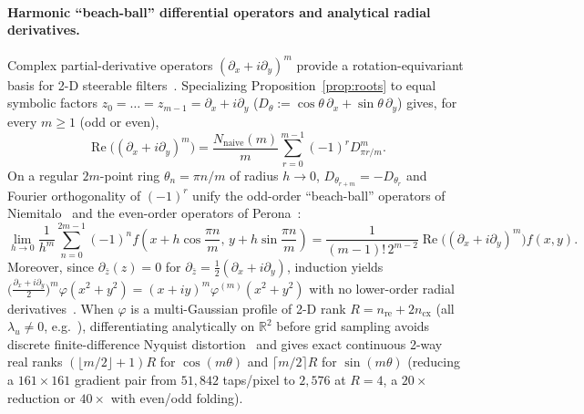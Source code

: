 \documentclass[11pt,a4paper]{article}
\theoremstyle{plain}
\theoremstyle{definition}
\newcommand{\R}{\mathbb{R}}
\newcommand{\Nnaive}{N_{\mathrm{naive}}}
\DeclareMathOperator{\RePart}{Re}
\begin{document}
\paragraph{Harmonic ``beach-ball'' differential operators and analytical radial derivatives.}
Complex partial-derivative operators $(\partial_x + i\partial_y)^m$ provide a rotation-equivariant basis for 2-D steerable filters~\cite{freeman1991steerable,koenderink1992generic,bigun2004linear,reisert2008complex}. Specializing Proposition~\ref{prop:roots} to equal symbolic factors $z_0 = \dots = z_{m-1} = \partial_x + i\partial_y$ ($D_\theta := \cos\theta\,\partial_x + \sin\theta\,\partial_y$) gives, for every $m \ge 1$ (odd or even),
\begin{equation}\label{eq:beachball}
  \RePart\!\bigl((\partial_x + i\partial_y)^m\bigr)
  = \frac{\Nnaive(m)}{m} \sum_{r=0}^{m-1} (-1)^r D_{\pi r / m}^m.
\end{equation}
On a regular $2m$-point ring $\theta_n = \pi n / m$ of radius $h \to 0$, $D_{\theta_{r+m}} = -D_{\theta_r}$ and Fourier orthogonality of $(-1)^r$ unify the odd-order ``beach-ball'' operators of Niemitalo~\cite{niemitalo2019beachball} and the even-order operators of Perona~\cite{perona1995deformable}:
\[
  \lim_{h \to 0} \frac{1}{h^m} \sum_{n=0}^{2m-1} (-1)^n f\!\left(x + h\cos\frac{\pi n}{m},\, y + h\sin\frac{\pi n}{m}\right)
  = \frac{1}{(m-1)!\,2^{m-2}} \RePart\!\bigl((\partial_x + i\partial_y)^m\bigr) f(x,y).
\]
Moreover, since $\partial_{\bar z}(z) = 0$ for $\partial_{\bar z} = \frac{1}{2}(\partial_x + i\partial_y)$, induction yields $\bigl(\frac{\partial_x + i\partial_y}{2}\bigr)^m \varphi(x^2 + y^2) = (x + iy)^m \varphi^{(m)}(x^2 + y^2)$ with no lower-order radial derivatives~\cite{bigun2004linear,reisert2008complex}. When $\varphi$ is a multi-Gaussian profile of 2-D rank $R = n_{\mathrm{re}} + 2n_{\mathrm{cx}}$ (all $\lambda_u \ne 0$, e.g.~\cite{niemitalo2019lowpass}), differentiating analytically on $\R^2$ before grid sampling avoids discrete finite-difference Nyquist distortion~\cite{niemitalo2019angle} and gives exact continuous 2-way real ranks $(\lfloor m/2\rfloor + 1)R$ for $\cos(m\theta)$ and $\lceil m/2\rceil R$ for $\sin(m\theta)$ (reducing a $161 \times 161$ gradient pair from $51{,}842$ taps/pixel to $2{,}576$ at $R = 4$, a $20\times$ reduction or $40\times$ with even/odd folding).
\end{document}
